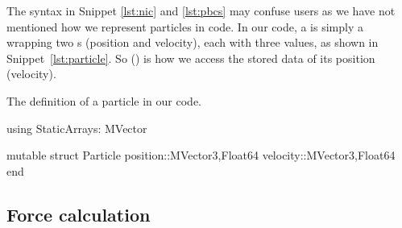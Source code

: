 The syntax in Snippet \ref{lst:nic} and \ref{lst:pbcs} may confuse users as we
have not mentioned how we represent particles in
code. In our code, a  is simply a  wrapping two
s (position and velocity), each with three  values, as shown in
Snippet~\ref{lst:particle}. So  () is how we access the
stored data of its position (velocity).

\begin{algorithm}
    \caption{The definition of a particle in our code.}
    \label{lst:particle}
    \begin{juliacode}
        using StaticArrays: MVector

        mutable struct Particle
            position::MVector{3,Float64}
            velocity::MVector{3,Float64}
        end
    \end{juliacode}
\end{algorithm}

\subsection{Force calculation}

